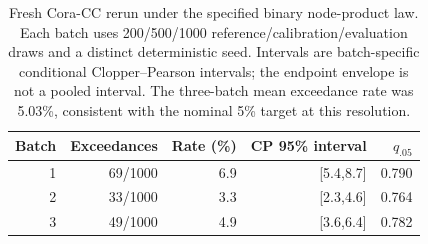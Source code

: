 \begin{table}[htbp]
\centering\small
\setlength{\tabcolsep}{4pt}
\begin{tabular}{rrrrr}
\toprule
Batch & Exceedances & Rate (\%) & CP 95\% interval & $q_{.05}$ \\
\midrule
1 & 69/1000 & 6.9 & [5.4,8.7] & 0.790 \\
2 & 33/1000 & 3.3 & [2.3,4.6] & 0.764 \\
3 & 49/1000 & 4.9 & [3.6,6.4] & 0.782 \\
\bottomrule
\end{tabular}
\caption{Fresh Cora-CC rerun under the specified binary node-product law. Each batch uses 200/500/1000 reference/calibration/evaluation draws and a distinct deterministic seed. Intervals are batch-specific conditional Clopper--Pearson intervals; the endpoint envelope is not a pooled interval. The three-batch mean exceedance rate was 5.03\%, consistent with the nominal 5\% target at this resolution.}
\label{tab:cora-rerun}
\end{table}
